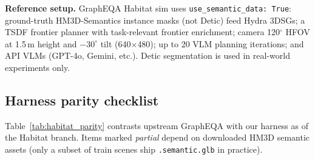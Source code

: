 \noindent\textbf{Reference setup.}
GraphEQA Habitat sim uses \texttt{use\_semantic\_data: True}: ground-truth HM3D-Semantics instance masks (not Detic) feed Hydra 3DSGs; a TSDF frontier planner with task-relevant frontier enrichment; camera 120$^\circ$ HFOV at 1.5\,m height and $-30^\circ$ tilt (640$\times$480); up to 20 VLM planning iterations; and API VLMs (GPT-4o, Gemini, etc.).
Detic segmentation is used in real-world experiments only.

\subsection{Harness parity checklist}

Table~\ref{tab:habitat_parity} contrasts upstream GraphEQA with our harness as of the Habitat branch.
Items marked \emph{partial} depend on downloaded HM3D semantic assets (only a subset of train scenes ship \texttt{.semantic.glb} in practice).

